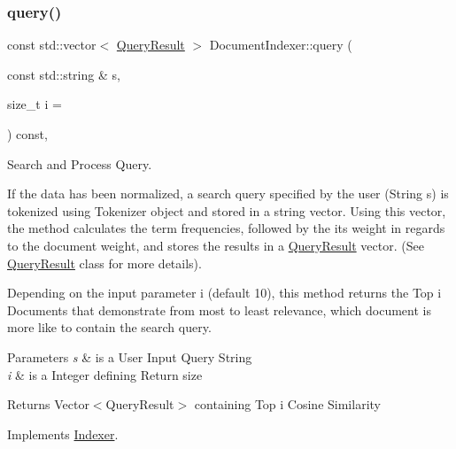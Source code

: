 \subsubsection{\texorpdfstring{query()}{query()}}
{\footnotesize\ttfamily const std\+::vector$<$ \hyperlink{class_query_result}{Query\+Result} $>$ Document\+Indexer\+::query (\begin{DoxyParamCaption}\item[{const std\+::string \&}]{s,  }\item[{size\+\_\+t}]{i = {} }\end{DoxyParamCaption}) const\hspace{0.3cm}{\ttfamily [override]}, {\ttfamily [virtual]}}



Search and Process Query. 

If the data has been normalized, a search query specified by the user (String s) is tokenized using Tokenizer object and stored in a string vector. Using this vector, the method calculates the term frequencies, followed by the its weight in regards to the document weight, and stores the results in a \hyperlink{class_query_result}{Query\+Result} vector. (See \hyperlink{class_query_result}{Query\+Result} class for more details).

Depending on the input parameter i (default 10), this method returns the Top i Documents that demonstrate from most to least relevance, which document is more like to contain the search query.


\begin{DoxyParams}{Parameters}
{\em s} & is a User Input Query String \\
\hline
{\em i} & is a Integer defining Return size \\
\hline
\end{DoxyParams}
\begin{DoxyReturn}{Returns}
Vector$<$\+Query\+Result$>$ containing Top i Cosine Similarity 
\end{DoxyReturn}


Implements \hyperlink{class_indexer_a8d98ba740db6f5f8521d557bf908aead}{Indexer}.

\mbox{\label{class_document_indexer_a48d441022f2f6ea3437f5a67b318e06e}} 
